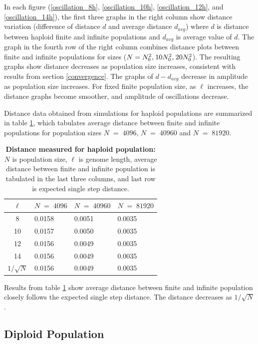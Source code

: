In each figure (\ref{oscillation_8h}, \ref{oscillation_10h}, \ref{oscillation_12h}, 
and \ref{oscillation_14h}), the first three graphs in the right column show 
distance variation (difference of distance $d$ and average distance $d_{avg}$)  
where $d$ is distance between haploid finite and infinite populations and $d_{avg}$ is average value of $d$. 
The graph in the fourth row of the right column combines distance plots between finite and infinite populations for sizes 
($N = N_0^2, \hspace{0.01in}10N_0^2, \hspace{0.01in}20N_0^2$). The resulting graphs show distance decreases 
as population size increases, consistent with results from section \ref{convergence}. 
The graphs of $d-d_{avg}$ decrease in amplitude as population size increases. 
For fixed finite population size, as $\ell$ increases, the distance graphs become smoother, and amplitude of oscillations decrease. 

Distance data obtained from simulations for haploid populations are summarized in table \ref{tableDistanceOscHap},  
which tabulates average distance between finite and infinite populations 
for population sizes $N \;=\; 4096 $, $N \;=\; 40960 $ and $N \;=\; 81920 $.
\begin{table}[h]
\caption[\textbf{Distance measured for haploid population}]{\textbf{Distance measured for haploid population:} $N$ is population size, $\ell$ is genome length, 
average distance between finite and infinite population is tabulated in the last three columns, and last row is expected single step distance.}
\centering
\begin{tabularx}{0.75\textwidth}{ c *{3}{X}}
\toprule
$\ell$ & $N \;=\; 4096 $ & $N \;=\; 40960 $ & $N \;=\; 81920 $\\
\midrule
8 & 0.0158 & 0.0051 & 0.0035 \\
10 & 0.0157 & 0.0050 & 0.0035 \\ 
12 & 0.0156 & 0.0049 & 0.0035 \\
14 & 0.0156 & 0.0049 & 0.0035 \\ 
\midrule
$1/\sqrt{N}$ & 0.0156 & 0.0049 & 0.0035 \\
\bottomrule
\end{tabularx}
\label{tableDistanceOscHap}
\end{table}

Results from table \ref{tableDistanceOscHap} show average distance between finite and infinite population closely follows 
the expected single step distance. The distance decreases as $1/\sqrt{N}$.

\clearpage
\subsection{Diploid Population}

